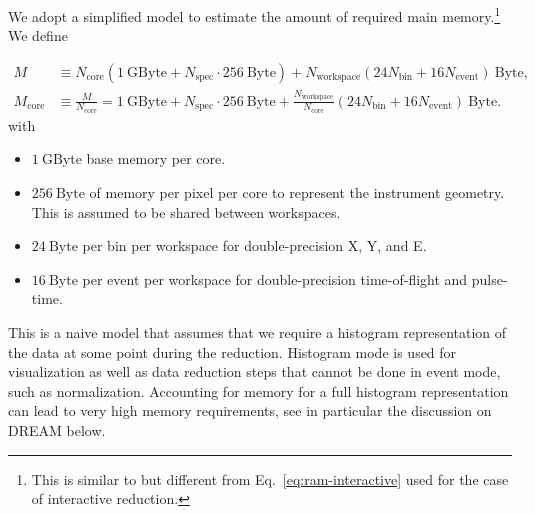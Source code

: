 \documentclass[a4paper,english,numbers=noenddot,bibliography=totoc,chapterprefix=on,DIV=12]{scrartcl}
\newcommand{\Nbin}{N_{\text{bin}}}
\newcommand{\Ncore}{N_{\text{core}}}
\newcommand{\Nevent}{N_{\text{event}}}
\newcommand{\Nworkspace}{N_{\text{workspace}}}
\newcommand{\Nspec}{N_{\text{spec}}}
\newcommand{\Mcore}{M_{\text{core}}}
\newcommand{\dream}{DREAM\xspace}
\begin{document}
We adopt a simplified model to estimate the amount of required main memory.\footnote{This is similar to but different from Eq.~\eqref{eq:ram-interactive} used for the case of interactive reduction.}
We define

\begin{align}
  \label{eq:ram}
  M &\equiv \Ncore(1~\mathrm{GByte} + \Nspec \cdot 256~\mathrm{Byte}) + N_{\text{workspace}}(24\Nbin + 16\Nevent)~\mathrm{Byte},\\
  \Mcore &\equiv \frac{M}{\Ncore} = 1~\mathrm{GByte} + \Nspec \cdot 256~\mathrm{Byte} + \frac{\Nworkspace}{\Ncore}(24\Nbin + 16\Nevent)~\mathrm{Byte}.
\end{align}
with
\begin{itemize}
  \item $1~\mathrm{GByte}$ base memory per core.
  \item $256~\mathrm{Byte}$ of memory per pixel per core to represent the instrument geometry.
    This is assumed to be shared between workspaces.
  \item $24~\mathrm{Byte}$ per bin per workspace for double-precision X, Y, and E.
  \item $16~\mathrm{Byte}$ per event per workspace for double-precision time-of-flight and pulse-time.
\end{itemize}
This is a naive model that assumes that we require a histogram representation of the data at some point during the reduction.
Histogram mode is used for visualization as well as data reduction steps that cannot be done in event mode, such as normalization.
Accounting for memory for a full histogram representation can lead to very high memory requirements, see in particular the discussion on \dream below.
\end{document}
